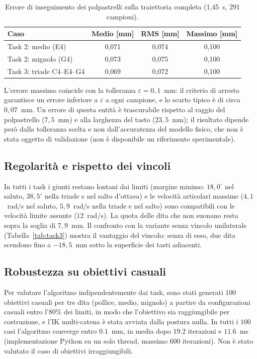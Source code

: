 \begin{table}[htbp]
    \centering
    \renewcommand{\arraystretch}{1.1}
    \begin{tabular}{|l|c|c|c|}
        \hline
        Caso & Medio [mm] & RMS [mm] & Massimo [mm]\\ \hline \hline
        Task 2: medio (E4) & 0,071 & 0,074 & 0,100\\
        Task 2: mignolo (G4) & 0,073 & 0,075 & 0,100\\
        Task 3: triade C4--E4--G4 & 0,069 & 0,072 & 0,100\\ \hline
    \end{tabular}
    \caption{Errore di inseguimento dei polpastrelli sulla traiettoria completa (1,45~s, 291 campioni).}
    \label{tab:tracking}
\end{table}

L'errore massimo coincide con la tolleranza $\varepsilon=0{,}1$~mm: il criterio di arresto garantisce un errore inferiore a $\varepsilon$ a ogni campione, e lo scarto tipico è di circa $0{,}07$~mm. Un errore di questa entità è trascurabile rispetto al raggio del polpastrello ($7{,}5$~mm) e alla larghezza del tasto ($23{,}5$~mm); il risultato dipende però dalla tolleranza scelta e non dall'accuratezza del modello fisico, che non è stata oggetto di validazione (non è disponibile un riferimento sperimentale).

\subsection{Regolarità e rispetto dei vincoli}

In tutti i task i giunti restano lontani dai limiti (margine minimo: $18{,}0^\circ$ nel saluto, $38{,}5^\circ$ nella triade e nel salto d'ottava) e le velocità articolari massime ($4{,}1$~rad/s nel saluto, $5{,}9$~rad/s nella triade e nel salto) sono compatibili con le velocità limite assunte ($12$~rad/s). La quota delle dita che non suonano resta sopra la soglia di $7{,}9$~mm. Il confronto con la variante senza vincolo unilaterale (Tabella~\ref{tab:task3}) mostra il vantaggio del vincolo: senza di esso, due dita scendono fino a $-18{,}5$~mm sotto la superficie dei tasti adiacenti.

\subsection{Robustezza su obiettivi casuali}

Per valutare l'algoritmo indipendentemente dai task, sono stati generati $100$ obiettivi casuali per tre dita (pollice, medio, mignolo) a partire da configurazioni casuali entro l'80\% dei limiti, in modo che l'obiettivo sia raggiungibile per costruzione, e l'IK multi-catena è stata avviata dalla postura nulla. In tutti i $100$ casi l'algoritmo converge entro $0.1$~mm, in media dopo $19.2$ iterazioni e $11.6$~ms (implementazione Python su un solo thread, massimo $600$ iterazioni). Non è stato valutato il caso di obiettivi irraggiungibili.


